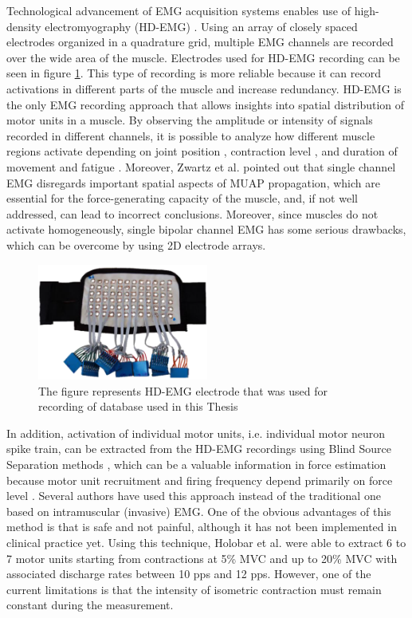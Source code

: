 Technological advancement of EMG acquisition systems enables use of high-density electromyography (HD-EMG) \citep{Zwarts2004}. Using an array of closely spaced electrodes organized in a quadrature grid, multiple EMG channels are recorded over the wide area of the muscle. Electrodes used for HD-EMG recording can be seen in figure \ref{fig:electrode}. This type of recording is more reliable because it can record activations in different parts of the muscle and increase redundancy. HD-EMG is the only EMG recording approach that allows insights into spatial distribution of motor units in a muscle. By observing the amplitude or intensity of signals recorded in different channels, it is possible to analyze how different muscle regions activate depending on joint position \citep{Vieira2010}, contraction level \citep{Holtermann2005}, and duration of movement and fatigue \citep{Tucker2009, Staudenmann2014}. Moreover, Zwartz et al. \citep{Zwarts2003} pointed out that single channel EMG disregards important spatial aspects of MUAP propagation, which are essential for the force-generating capacity of the muscle, and, if not well addressed, can lead to incorrect conclusions. Moreover, since muscles do not activate homogeneously, single bipolar channel EMG has some serious drawbacks, which can be overcome by using 2D electrode arrays. 
\begin{figure}[ht]
\centering
\includegraphics[width=0.5\textwidth]{Images/introduction/elektrode.png}
\caption{The figure represents HD-EMG electrode that was used for recording of database used in this Thesis}
\label{fig:electrode}
\end{figure}

In addition, activation of individual motor units, i.e. individual motor neuron spike train, can be extracted from the HD-EMG recordings using Blind Source Separation methods \citep{Holobar2007, Holobar2010}, which can be a valuable information in force estimation because motor unit recruitment and firing frequency depend primarily on force level \citep{Merletti-book}. Several authors have used this approach instead of the traditional one based on intramuscular (invasive) EMG. One of the obvious advantages of this method is that is safe and not painful, although it has not been implemented in clinical practice yet. Using this technique, Holobar et al.  \citep{Holobar2010} were able to extract 6 to 7 motor units starting from contractions at 5\% MVC and up to 20\% MVC with associated discharge rates between 10 pps and 12 pps. However, one of the current limitations is that the intensity of isometric contraction must remain constant during the measurement.

